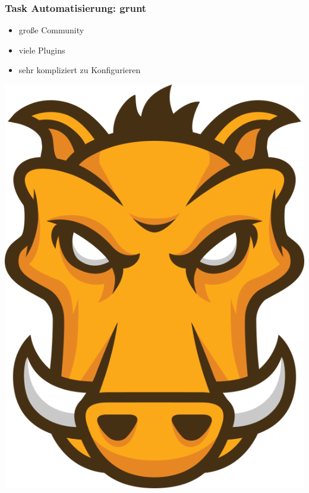 \documentclass{beamer}
\begin{document}
\begin{frame}
\frametitle{Task Automatisierung: grunt}
\begin{itemize}
\item große Community
\item viele Plugins
\item sehr kompliziert zu Konfigurieren
\end{itemize}
\centerline{\includegraphics[scale=0.4]{assets/grunt.png}}
\end{frame}

\end{document}
